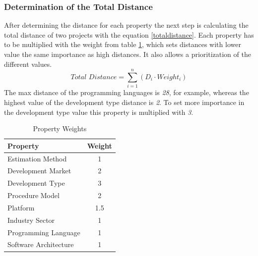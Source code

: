 \subsubsection{\textbf{Determination of the Total Distance}}
After determining the distance for each property the next step is calculating the total distance of two projects with the equation \ref{totaldistance}. Each property has to be multiplied with the weight from table \ref{propertyweights}, which sets distances with lower value the same importance as high distances. It also allows a prioritization of the different values. 
\begin{equation}
\textit{Total Distance} = \sum \limits_{i=1}^n ( D_i \cdot Weight_i )\label{totaldistance}
\end{equation}
The max distance of the programming languages is \textit{28}, for example, whereas the highest value of the development type distance is \textit{2}. To set more importance in the development type value this property is multiplied with \textit{3}.
\begin{table}[h]
	\centering 
	\setlength{\tabcolsep}{4pt}
	\begin{tabular}{|l|c|}\hline
		Property	& Weight 	\\ \hline
		Estimation Method   	& 1      	\\ \hline
		Development Market   	& 2      	\\ \hline
		Development Type   		& 3      	\\ \hline
		Procedure Model   		& 2      	\\ \hline
		Platform   				& 1.5      	\\ \hline
		Industry Sector   		& 1      	\\ \hline
		Programming Language   	& 1      	\\ \hline
		Software Architecture   & 1      	\\ \hline
	\end{tabular} 
	\caption{Property Weights} 
	\label{propertyweights} 
\end{table}
